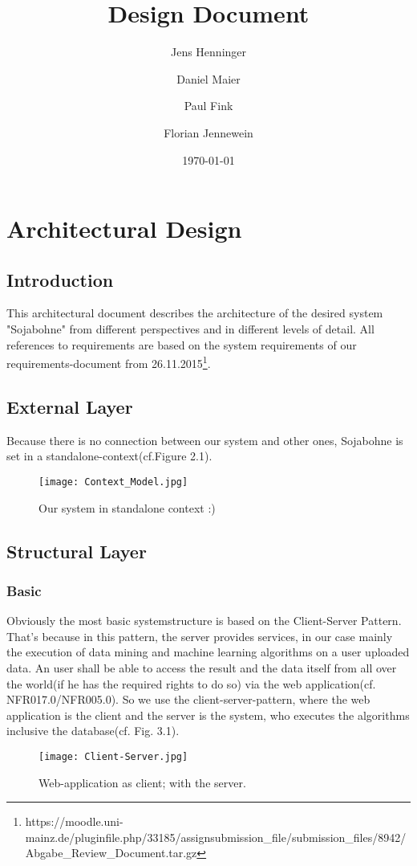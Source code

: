 \documentclass{book}
\title{Design Document}
\author{Jens Henninger \and Daniel Maier \and Paul Fink \and Florian Jennewein}
\date{\today}
\begin{document}
\frontmatter
\maketitle
\tableofcontents
\mainmatter
\part{Architectural Design}

\chapter{Introduction}
This architectural document describes the architecture of the desired system 
"Sojabohne" from different perspectives and in different levels of detail. 
All references to requirements are based on the system requirements of our requirements-document from 26.11.2015\footnote{https://moodle.uni-mainz.de/pluginfile.php/33185/assignsubmission\_file/submission\_files/8942/Abgabe\_Review\_Document.tar.gz}.
\chapter{External Layer}
Because there is no connection between our system and other ones,
 Sojabohne is set in a standalone-context(cf.Figure 2.1). 
\begin{figure}[h]
\centering
\texttt{[image: Context\_Model.jpg]}
\caption{Our system in standalone context :)}
\label{Fig. 1}
\end{figure}
\chapter{Structural Layer}
\section{Basic}
Obviously the most basic systemstructure is based on the Client-Server Pattern.
That's because in this pattern, the server provides services, in our case mainly
the execution of data mining and machine learning algorithms on a user uploaded data.
An user shall be able to access the result and the data itself from all over the
world(if he has the required rights to do so) via the web application(cf. NFR017.0/NFR005.0). 
So we use the client-server-pattern, where the web application is the client and the server
is the system, who executes the algorithms inclusive the database(cf. Fig. 3.1).
\begin{figure}[h]
\centering
\texttt{[image: Client-Server.jpg]}
\caption{Web-application as client; with the server.}
\label{Fig. 2}
\end{figure}
\end{document}
